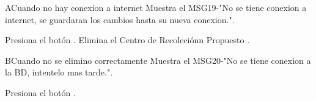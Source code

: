 \begin{UCtrayectoriaA}{A}{Cuando no hay conexion a internet}
	\UCpaso Muestra el MSG19-"No se tiene conexion a internet, se guardaran los cambios hasta su nueva conexion.".
	\item\UCactor Presiona el botón .
	\UCpaso Elimina el Centro de Recoleciónn Propuesto .	
\end{UCtrayectoriaA}

\begin{UCtrayectoriaA}{B}{Cuando no se elimino correctamente}
	\UCpaso Muestra el MSG20-"No se tiene conexion a la BD, intentelo mas tarde.".
	\item\UCactor Presiona el botón .
\end{UCtrayectoriaA}


 
 

 
 
